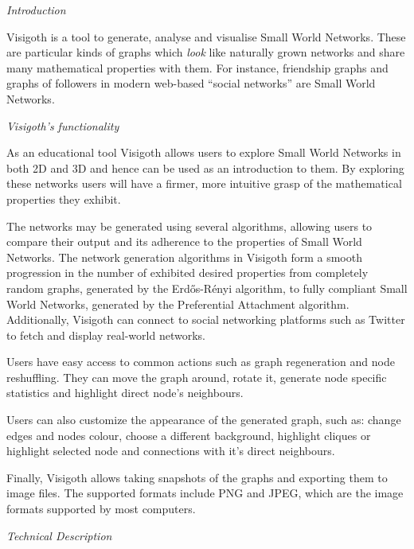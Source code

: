 \documentclass[a4paper,11pt,titlepage]{article}
\begin{document}
\begin{description}
	\item \emph{Introduction}

Visigoth is a tool to generate, analyse and visualise Small World
Networks. These are particular kinds of graphs which \emph{look} like naturally
grown networks and share many mathematical properties with them.  For instance,
friendship graphs and graphs of followers in modern web-based ``social
networks'' are Small World Networks.

	\item \emph{Visigoth's functionality}

As an educational tool Visigoth allows users to explore Small World Networks in
both 2D and 3D and hence can be used as an introduction to them. By exploring 
these networks users will have a firmer, more intuitive grasp of the mathematical 
properties they exhibit.

The networks may be generated using several algorithms, allowing users to
compare their output and its adherence to the properties of Small World
Networks. The network generation algorithms in Visigoth form a smooth
progression in the number of exhibited desired properties from completely random
graphs, generated by the Erd\H{o}s-R\'{e}nyi algorithm, to fully compliant Small
World Networks, generated by the Preferential Attachment
algorithm. Additionally, Visigoth can connect to social networking platforms
such as Twitter to fetch and display real-world networks.

Users have easy access to common actions such as graph regeneration and node
reshuffling. They can move the graph around, rotate it, generate node specific
statistics and highlight direct node's neighbours. 

Users can also customize the appearance of the generated graph, such as:
change edges and nodes colour, choose a different background, highlight cliques
or highlight selected node and connections with it's direct neighbours.

Finally, Visigoth allows taking snapshots of the graphs and exporting them to image files. The supported formats include PNG and JPEG, which are the image formats supported by most computers.

	\item \emph{Technical Description}


\end{description}
\end{document}
